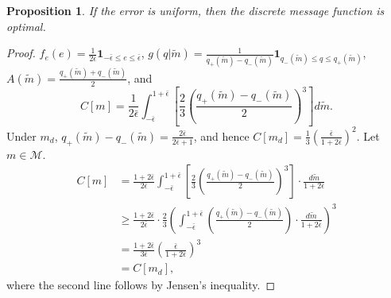 \documentclass[12pt]{article}
\newtheorem{proposition}{Proposition}
\begin{document}
\pagebreak
\begin{proposition}\label{prop:discreteisoptimal}
If the error is uniform, then the discrete message function is optimal. 
\end{proposition}
\begin{proof}
$f_{e}(e)=\tfrac{1}{2\bar{\epsilon}}\mathbf{1}_{-\bar{\epsilon}\leq e\leq\bar{\epsilon}}$, $g(q|\widetilde{m})=\tfrac{1}{q_{+}(\widetilde{m})-q_{-}(\widetilde{m})}\mathbf{1}_{q_{-}(\widetilde{m})\leq q\leq q_{+}(\widetilde{m})}$, $A(\widetilde{m})=\tfrac{q_{+}(\widetilde{m})+q_{-}(\widetilde{m})}{2}$, and
\begin{equation}
C[m]=\frac{1}{2\bar{\epsilon}}\int_{-\bar{\epsilon}}^{1+\bar{\epsilon}}{\left[\frac{2}{3}\left(\frac{q_{+}(\widetilde{m})-q_{-}(\widetilde{m})}{2}\right)^{3}\right]d\widetilde{m}}.
\end{equation}
Under $m_{d}$, $q_{+}(\widetilde{m})-q_{-}(\widetilde{m})=\tfrac{2\bar{\epsilon}}{2\bar{\epsilon}+1}$, and hence $C[m_{d}]=\tfrac{1}{3}\left(\tfrac{\bar{\epsilon}}{1+2\bar{\epsilon}}\right)^{2}$. Let $m\in\mathcal{M}$.
\begin{align}
C[m]&=\frac{1+2\bar{\epsilon}}{2\bar{\epsilon}}\int_{-\bar{\epsilon}}^{1+\bar{\epsilon}}{\left[\frac{2}{3}\left(\frac{q_{+}(\widetilde{m})-q_{-}(\widetilde{m})}{2}\right)^{3}\right]\cdot\frac{d\widetilde{m}}{1+2\bar{\epsilon}}}\\
&\geq\frac{1+2\bar{\epsilon}}{2\bar{\epsilon}}\cdot\frac{2}{3}\left(\int_{-\bar{\epsilon}}^{1+\bar{\epsilon}}{\left(\frac{q_{+}(\widetilde{m})-q_{-}(\widetilde{m})}{2}\right)\cdot\frac{d\widetilde{m}}{1+2\bar{\epsilon}}}\right)^{3}\\
&=\frac{1+2\bar{\epsilon}}{3\bar{\epsilon}}\left(\frac{\bar{\epsilon}}{1+2\bar{\epsilon}}\right)^{3}\\
&=C[m_{d}],
\end{align}
where the second line follows by Jensen's inequality.
\end{proof}
\end{document}
